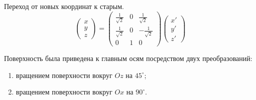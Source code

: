 Переход от новых координат к старым.
\[
  \begin{pmatrix} x \\ y \\ z \end{pmatrix} =
  \begin{pmatrix}
    \frac{1}{\sqrt{2}} & 0 & \frac{1}{\sqrt{2}} \\
    \frac{1}{\sqrt{2}} & 0 & -\frac{1}{\sqrt{2}} \\
    0 & 1 & 0
  \end{pmatrix}
  \begin{pmatrix}
    x' \\ y' \\ z'
  \end{pmatrix}
\]

Поверхность была приведена к главным осям посредством двух преобразований:
\begin{enumerate}
  \item вращением поверхности вокруг \(Oz\) на \(45^{\circ}\);
  \item вращением поверхности вокруг \(Ox\) на \(90^{\circ}\).
\end{enumerate}
